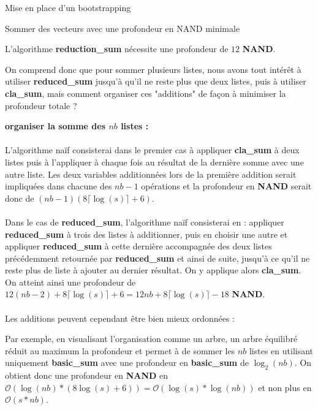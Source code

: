 \begin{section}{Mise en place d'un bootstrapping}
\begin{subsection}{Sommer des vecteurs avec une profondeur en NAND minimale}
\begin{prop}
	L'algorithme \textbf{reduction\_sum} nécessite une profondeur de $12$ \textbf{NAND}.
\end{prop}

	On comprend donc que pour sommer plusieurs listes, nous avons tout
	intérêt à utiliser \textbf{reduced\_sum} jusqu'à qu'il ne reste plus
	que deux listes, puis à utiliser \textbf{cla\_sum}, mais comment organiser ces "additions" de façon à minimiser la profondeur totale ?

\vspace{0.3cm}
\noindent
\textbf{organiser la somme des $nb$ listes :}
\paragraph{}
	L'algorithme naïf consisterai dans le premier cas à appliquer
	\textbf{cla\_sum} à deux listes puis à l'appliquer à chaque fois au
	résultat de la dernière somme avec une autre liste. Les deux variables
	additionnées lors de la première addition serait impliquées dans
	chacune	des $nb-1$ opérations et la profondeur en \textbf{NAND} serait
	donc de $(nb-1)(8\lceil\log(s)\rceil + 6)$.
	
\paragraph{}
	Dans le cas de \textbf{reduced\_sum}, l'algorithme naïf consisterai en
	: appliquer \textbf{reduced\_sum} à trois des listes à additionner,
	puis en choisir une autre et appliquer \textbf{reduced\_sum} à cette
	dernière accompagnée des deux listes précédemment retournée par
	\textbf{reduced\_sum} et ainsi de suite, jusqu'à ce qu'il ne reste plus
	de liste à ajouter au dernier résultat. On y applique alors \textbf{cla\_sum}. On atteint ainsi une profondeur de 
	$12(nb - 2) + 8 \lceil \log(s) \rceil + 6 = 12 nb + 8 \lceil \log(s)
	\rceil - 18$ \textbf{NAND}.
	
\paragraph{}
	Les additions peuvent cependant être bien mieux ordonnées :
	
	Par exemple, en visualisant l'organisation comme un arbre, un arbre
	équilibré réduit au maximum la profondeur et permet à de sommer les
	$nb$ listes en utilisant uniquement \textbf{basic\_sum} avec une
	profondeur en \textbf{basic\_sum} de $\log_2(nb)$. On obtient donc une
	profondeur en \textbf{NAND} en $\mathcal{O}(\log(nb) * (8\log(s) + 6))
	= \mathcal{O}(\log(s) * \log(nb))$ et non plus en $\mathcal{O}(s * nb)$.


\end{subsection}
\end{section}
